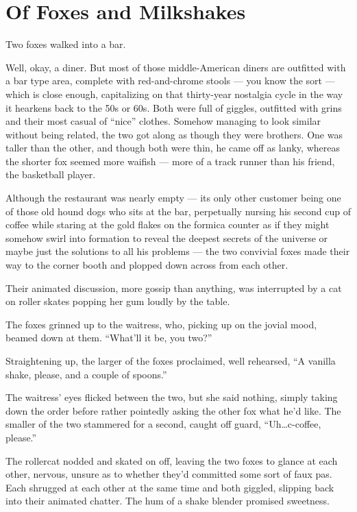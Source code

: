 \chapter{Of Foxes and Milkshakes}

Two foxes walked into a bar.

Well, okay, a diner. But most of those middle-American diners are outfitted with a bar type area, complete with red-and-chrome stools --- you know the sort --- which is close enough, capitalizing on that thirty-year nostalgia cycle in the way it hearkens back to the 50s or 60s. Both were full of giggles, outfitted with grins and their most casual of ``nice'' clothes. Somehow managing to look similar without being related, the two got along as though they were brothers. One was taller than the other, and though both were thin, he came off as lanky, whereas the shorter fox seemed more waifish --- more of a track runner than his friend, the basketball player.

Although the restaurant was nearly empty --- its only other customer being one of those old hound dogs who sits at the bar, perpetually nursing his second cup of coffee while staring at the gold flakes on the formica counter as if they might somehow swirl into formation to reveal the deepest secrets of the universe or maybe just the solutions to all his problems --- the two convivial foxes made their way to the corner booth and plopped down across from each other.

Their animated discussion, more gossip than anything, was interrupted by a cat on roller skates popping her gum loudly by the table.

The foxes grinned up to the waitress, who, picking up on the jovial mood, beamed down at them. ``What'll it be, you two?''

Straightening up, the larger of the foxes proclaimed, well rehearsed, ``A vanilla shake, please, and a couple of spoons.''

The waitress' eyes flicked between the two, but she said nothing, simply taking down the order before rather pointedly asking the other fox what he'd like. The smaller of the two stammered for a second, caught off guard, ``Uh\ldots c-coffee, please.''

The rollercat nodded and skated on off, leaving the two foxes to glance at each other, nervous, unsure as to whether they'd committed some sort of faux pas. Each shrugged at each other at the same time and both giggled, slipping back into their animated chatter. The hum of a shake blender promised sweetness.

